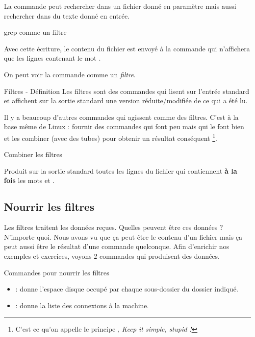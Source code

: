 \documentclass[a4paper,11pt]{style-esi/td}
\begin{document}
		La commande 
		peut rechercher dans un fichier donné en paramètre
		mais aussi rechercher dans du texte donné en entrée.

		\begin{Exemple}{grep comme un filtre}
			
			\medskip
			Avec cette écriture, le contenu du fichier 
			est envoyé à la commande  qui n'affichera
			que les lignes contenant le mot .
		\end{Exemple}

		On peut voir la commande comme un \emph{filtre}.

		\begin{theorie}{Filtres - Définition}
			Les filtres sont des commandes qui lisent sur l'entrée standard
			et affichent sur la sortie standard 
			une version réduite/modifiée de ce qui a été lu.
		\end{theorie}
	
		Il y a beaucoup d'autres commandes qui agissent comme des filtres.
		C'est à la base même de Linux : fournir des commandes qui font peu 
		mais qui le font bien et les combiner (avec des tubes)
		pour obtenir un résultat conséquent%
		\footnote{%
			C'est ce qu'on appelle le principe , 
			\emph{Keep it simple, stupid !}
		}.

\newpage

		\begin{Exemple}{Combiner les filtres}
			
			\medskip
			Produit sur la sortie standard toutes les lignes du fichier
			 qui contiennent \textbf{à la fois}
			les mots  et .
		\end{Exemple}

	\subsection{Nourrir les filtres}
	
		Les filtres traitent les données reçues.
		Quelles peuvent être ces données ? N'importe quoi.
		Nous avons vu que ça peut être le contenu d'un fichier
		mais ça peut aussi être le résultat d'une commande quelconque.
		Afin d'enrichir nos exemples et exercices, 
		voyons 2 commandes qui produisent des données.

		\begin{theorie}{Commandes pour nourrir les filtres}
			\begin{itemize}
			\item 
				 : 
				donne l'espace disque occupé par chaque sous-dossier
				du dossier indiqué.
			\item 
				 : 
				donne la liste des connexions à la machine.
			\end{itemize}
		\end{theorie}
\end{document}
